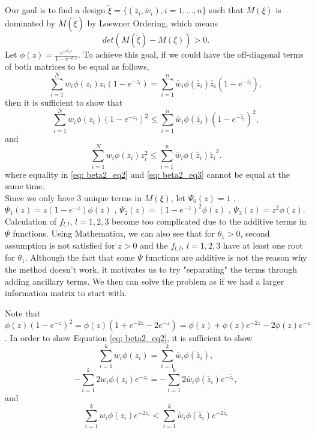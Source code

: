 \documentclass[11pt]{amsart}
\theoremstyle{definition}
\theoremstyle{remark}
\begin{document}
Our goal is to find a design $\tilde{\xi} = \{(\tilde{z_i},\tilde{w_i}), i=1,\ldots,n\}$ such that $M(\xi)$ is dominated by $M(\tilde{\xi})$ by Loewner Ordering, which means \[det(M(\tilde{\xi})-M(\xi))>0.\] Let $\phi(z) = \frac{e^{-\theta_1z}}{1-e^{-\theta_1z}}$. To achieve this goal, if we could have the off-diagonal terms of both matrices to be equal as follows,
\begin{equation}\label{eq: beta2_eq1}
\sum_{i=1}^{N} w_i \phi(z_i)z_i(1-e^{-z_i}) = \sum_{i=1}^{n} \tilde{w_i}  \phi(\tilde{z_i}) \tilde{z_i}(1-e^{-\tilde{z_i}}),
\end{equation}
then it is sufficient to show that 
\begin{equation}\label{eq: beta2_eq2}
\sum_{i=1}^{N} w_i  \phi(z_i)(1-e^{-z_i})^2 \le \sum_{i=1}^{n} \tilde{w_i} \phi(\tilde{z_i}) (1-e^{-\tilde{z_i}})^2,
\end{equation}
and
\begin{equation}\label{eq: beta2_eq3}
\sum_{i=1}^{N} w_i \phi(z_i)z_i^2 \le \sum_{i=1}^{n} \tilde{w_i}\phi(\tilde{z_i})\tilde{z_i}^2.
\end{equation} where equality in \eqref{eq: beta2_eq2} and \eqref{eq: beta2_eq3} cannot be equal at the same time.\\

Since we only have 3 unique terms in $M(\xi)$, let $\Psi_0(z) = 1$ , $\Psi_1(z) = z(1-e^{-z})\phi(z)$ , $\Psi_2(z) = (1-e^{-z})^2\phi(z)$ , $\Psi_3(z) = z^2\phi(z)$. Calculation of $f_{l,l}$, $l=1,2,3$ become too complicated due to the additive terms in $\Psi$ functions. Using Mathematica, we can also see that for $\theta_1>0$, second assumption is not satisfied for $z>0$ and the $f_{l,l}$, $l=1,2,3$ have at least one root for $\theta_1$. Although the fact that some $\Psi$ functions are additive is not the reason why the method doesn't work, it motivates us to try "separating" the terms through adding ancillary terms.  We then can solve the problem as if we had a larger information matrix to start with. 

Note that $\phi(z)(1-e^{-z})^2 = \phi(z)(1+e^{-2z}-2e^{-z}) = \phi(z)+\phi(z)e^{-2z}-2\phi(z)e^{-z}$. In order to show Equation \eqref{eq: beta2_eq2}, it is sufficient to show 
\begin{equation}\label{eq: beta_eq21}
\sum_{i=1}^{k} w_i \phi(z_i) = \sum_{i=1}^{k} \tilde{w_i}  \phi(\tilde{z_i}),\end{equation}
\begin{equation}\label{eq: beta_eq22}
-\sum_{i=1}^{k}2 w_i  \phi(z_i)e^{-z_i} = -\sum_{i=1}^{k}2 \tilde{w_i} \phi(\tilde{z_i}) e^{-\tilde{z_i}},
\end{equation}
and
\begin{equation}\label{eq: beta_eq23}
\sum_{i=1}^{k} w_i \phi(z_i)e^{-2z_i} < \sum_{i=1}^{k} \tilde{w_i}\phi(\tilde{z_i})e^{-2\tilde{z_i}}
\end{equation}
\end{document}
